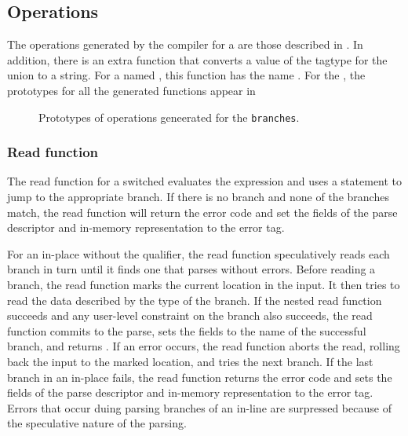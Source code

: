\subsection{Operations}
The operations generated by the \pads{} compiler for a \Punion{} are
those described in .  In addition, there
is an extra function that converts a value of the tagtype for the
union to a string.  For a \Punion{} named , this function
has the name .  
For the \Punion{}
, the prototypes for all the generated functions appear in
\begin{figure}

\caption{Prototypes of operations geneerated for
  the \Punion{} \texttt{branches}.}
\label{fig:punion-ops}
\end{figure}



\subsubsection{Read function}
The read function for a switched \Punion{} evaluates the \Pswitch{}
expression and uses a \C{}  statement to jump to the
appropriate branch.  If there is no \Pdefault{} branch and none of the
\Pcase{} branches match,  the read function will return the error code
 and set the  fields of the parse
descriptor and in-memory representation to the error tag. 

For an in-place \Punion{} without the \Plongest{} qualifier, the read
function speculatively reads each 
branch in turn until it finds one that parses without errors.  Before
reading a branch, the read function marks the 
current location in the input.  It then tries to read the data
described by the type of the branch.  If the nested read function
succeeds and any user-level constraint on the branch also succeeds,
the read function commits to the parse, sets the  fields to
the name of the successful branch, and returns
. If an error occurs, the read function aborts the
read, rolling back the input to the marked location, and tries the next
branch.  If the last branch in an in-place \Punion{} fails, the read
function returns the error code
 and sets the  fields of the parse
descriptor and in-memory representation to the error tag. 
Errors that occur duing parsing branches of an in-line \Punion{} are
surpressed because of the speculative nature of the parsing.

